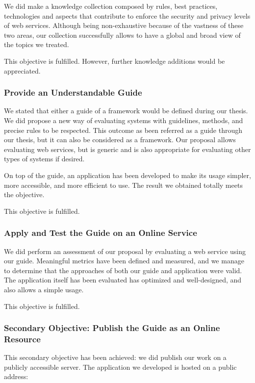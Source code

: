 We did make a knowledge collection composed by rules, best practices, technologies and aspects that contribute to enforce the security and privacy levels of web services. Although being non-exhaustive because of the vastness of these two areas, our collection successfully allows to have a global and broad view of the topics we treated.

This objective is fulfilled. However, further knowledge additions would be appreciated.

\subsubsection{Provide an Understandable Guide}

We stated that either a guide of a \gls{framework} would be defined during our thesis. We did propose a new way of evaluating systems with guidelines, methods, and precise rules to be respected. This outcome as been referred as a guide through our thesis, but it can also be considered as a \gls{framework}. Our proposal allows evaluating web services, but is generic and is also appropriate for evaluating other types of systems if desired.

On top of the guide, an application has been developed to make its usage simpler, more accessible, and more efficient to use. The result we obtained totally meets the objective.

This objective is fulfilled.

\subsubsection{Apply and Test the Guide on an Online Service}

We did perform an assessment of our proposal by evaluating a web service using our guide. Meaningful metrics have been defined and measured, and we manage to determine that the approaches of both our guide and application were valid. The application itself has been evaluated has optimized and well-designed, and also allows a simple usage.

This objective is fulfilled.

\subsubsection{Secondary Objective: Publish the Guide as an Online Resource}

This secondary objective has been achieved: we did publish our work on a publicly accessible server. The application we developed is hosted on a public address:


